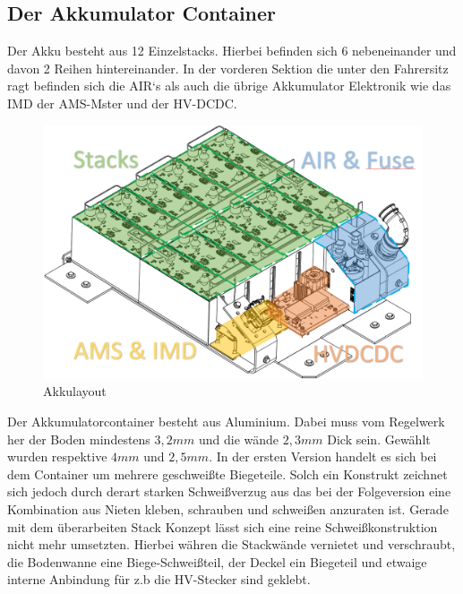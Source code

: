 \FloatBarrier
\subsection{Der Akkumulator Container}

Der Akku besteht aus 12 Einzelstacks. Hierbei befinden sich 6 nebeneinander und davon 2 Reihen hintereinander. In der vorderen Sektion die unter den Fahrersitz ragt befinden sich die \ac{AIR}`s als auch die übrige Akkumulator Elektronik wie das \ac{IMD} der \ac{AMS}-Mster und der \ac{HV}-DCDC.

\begin{figure}
	\centering
	\includegraphics[width=0.7\linewidth]{bilder/HV_Akkumulator_Layout}
	\caption{Akkulayout}
	\label{fig:hvakkumulatorlayout}
\end{figure}


Der Akkumulatorcontainer besteht aus Aluminium. Dabei muss vom Regelwerk her der Boden mindestens \ensuremath{3,2 mm} und die wände \ensuremath{2,3 mm} Dick sein. \cite{FSRules} Gewählt wurden respektive \ensuremath{4 mm} und \ensuremath{2,5 mm}. In der ersten Version handelt es sich bei dem Container um mehrere geschweißte Biegeteile. Solch ein Konstrukt zeichnet sich jedoch durch derart starken Schweißverzug aus das bei der Folgeversion eine Kombination aus Nieten kleben, schrauben und schweißen anzuraten ist. Gerade mit dem überarbeiten Stack Konzept lässt sich eine reine Schweißkonstruktion nicht mehr umsetzten. Hierbei währen die Stackwände vernietet und verschraubt, die Bodenwanne eine Biege-Schweißteil, der Deckel ein Biegeteil und etwaige interne Anbindung für z.b die \ac{HV}-Stecker sind geklebt.


